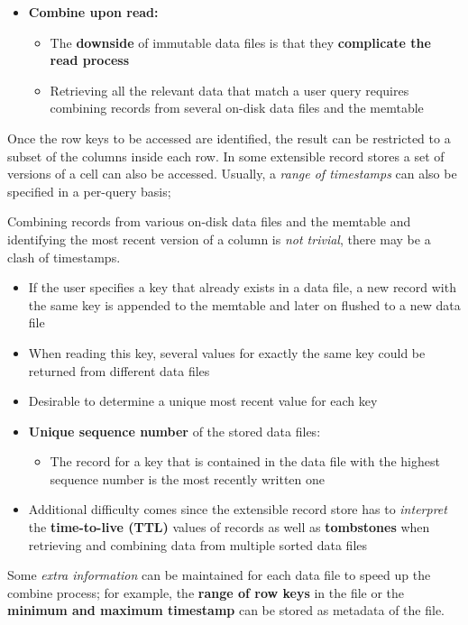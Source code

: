 \begin{itemize}
\begin{itemize}
    \end{itemize}
    \item \textbf{Combine upon read:} 
    \begin{itemize}
        \item The \textbf{downside} of immutable data files is that they \textbf{complicate the read process}
        \item Retrieving all the relevant data that match a user query requires combining records from several on-disk data files and the memtable
    \end{itemize}
\end{itemize}


Once the row keys to be accessed are identified, the result can be restricted to a subset of the columns inside each row. In some extensible record stores a set of versions of a cell can also be accessed. Usually, a \textit{range of timestamps} can also be specified in a per-query basis;

Combining records from various on-disk data files and the memtable and identifying the most recent version of a column is \textit{not trivial}, there may be a clash of timestamps.
\begin{itemize}
    \item If the user specifies a key that already exists in a data file, a new record with the same key is appended to the memtable and later on flushed to a new data file
    \item When reading this key, several values for exactly the same key could be returned from different data files
    \item Desirable to determine a unique most recent value for each key
    \item \textbf{Unique sequence number} of the stored data files:
    \begin{itemize}
        \item The record for a key that is contained in the data file with the highest sequence number is the most recently written one
    \end{itemize}
    \item Additional difficulty comes since the extensible record store has to \textit{interpret} the \textbf{time-to-live (TTL)} values of records as well as \textbf{tombstones} when retrieving and combining data from multiple sorted data files
\end{itemize}
Some \textit{extra information} can be maintained for each data file to speed up the combine process; for example, the \textbf{range of row keys} in the file or the \textbf{minimum and maximum timestamp} can be stored as metadata of the file.



